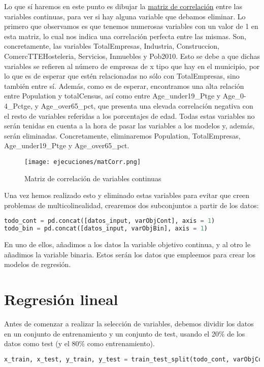 \documentclass[a4paper,onecolumn]{extarticle}
\let\stdsection\section
\renewcommand\section{\newpage\stdsection}
\begin{document}
\begin{sloppypar}
Lo que sí haremos en este punto es dibujar la \hyperref[fig:fig:matCorr]{matriz de correlación} entre las variables continuas, para ver si hay alguna variable
que debamos eliminar. Lo primero que observamos es que tenemos numerosas variables con un valor de 1 en esta matriz, lo cual nos indica una correlación perfecta 
entre las mismas. Son, concretamente, las variables TotalEmpresas, Industria, Construccion, ComercTTEHosteleria, Servicios, Inmuebles y Pob2010. Esto se debe a 
que dichas variables se refieren al número de empresas de x tipo que hay en el municipio, por lo que es de esperar que estén relacionadas no sólo con TotalEmpresas, 
sino también entre sí. Además, como es de esperar, encontramos una alta relación entre Population y totalCensus, así como entre Age\_under19\_Ptge y 
Age\_0-4\_Pctge, y Age\_over65\_pct, que presenta una elevada correlación negativa con el resto de variables referidas a los porcentajes de edad. Todas estas 
variables no serán tenidas en cuenta a la hora de pasar las variables a los modelos y, además, serán eliminadas. Concretamente, eliminaremos Population, 
TotalEmpresas, Age\_under19\_Ptge y Age\_over65\_pct.

\begin{center}
    \begin{figure}[h!]
        \centering
        \texttt{[image: ejecuciones/matCorr.png]}
        \caption{Matriz de correlación de variables continuas}
        \label{fig:matCorr}
    \end{figure}
\end{center}

Una vez hemos realizado esto y eliminado estas variables para evitar que creen problemas de multicolinealidad, crearemos dos subconjuntos a partir de los datos:
\begin{lstlisting}[language=Python,numbers=none]
todo_cont = pd.concat([datos_input, varObjCont], axis = 1)
todo_bin = pd.concat([datos_input, varObjBin], axis = 1)
\end{lstlisting}
En uno de ellos, añadimos a los datos la variable objetivo continua, y al otro le añadimos la variable binaria. Estos serán los datos que empleemos para crear
los modelos de regresión.

\section{Regresión lineal}\label{lineal}
Antes de comenzar a realizar la selección de variables, debemos dividir los datos en un conjunto de entrenamiento y un conjunto de test, usando el 20\% de los 
datos como test (y el 80\% como entrenamiento).
\begin{lstlisting}[language=Python, numbers=none]
x_train, x_test, y_train, y_test = train_test_split(todo_cont, varObjCont, test_size = 0.2, random_state = 29112002)
\end{lstlisting}


\end{sloppypar}
\end{document}
